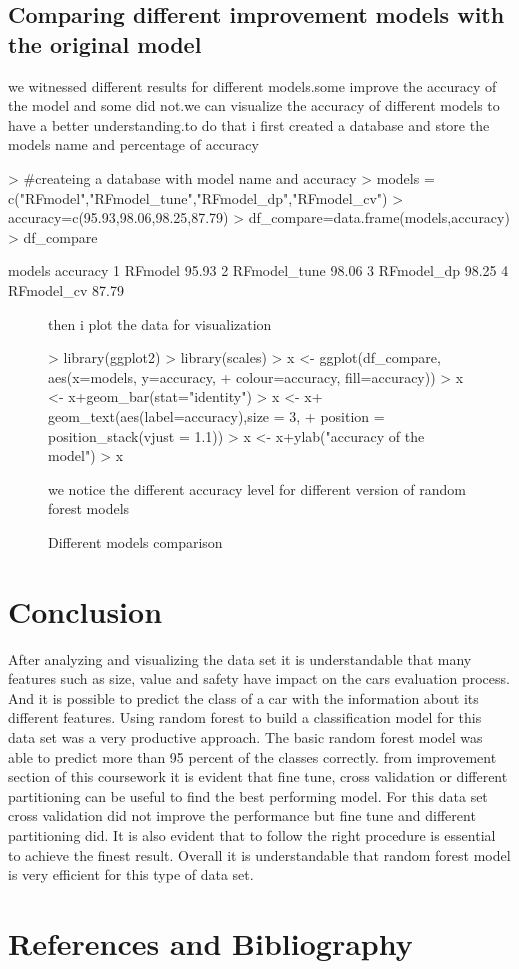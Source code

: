 \documentclass{article}
\begin{document}
\subsection{Comparing different improvement models with the original model}
we witnessed different results for different models.some improve the accuracy of the model and some did not.we can visualize the accuracy of different models to have a better understanding.to do that i first created a database and store the models name and percentage of accuracy
\begin{Schunk}
\begin{Sinput}
> #createing a database with model name and accuracy
> models = c("RFmodel","RFmodel_tune","RFmodel_dp","RFmodel_cv")
> accuracy=c(95.93,98.06,98.25,87.79)
> df_compare=data.frame(models,accuracy)
> df_compare
\end{Sinput}
\begin{Soutput}
        models accuracy
1      RFmodel    95.93
2 RFmodel_tune    98.06
3   RFmodel_dp    98.25
4   RFmodel_cv    87.79
\end{Soutput}
\end{Schunk}
\begin{figure}
then i plot the data for visualization
\begin{Schunk}
\begin{Sinput}
> library(ggplot2)
> library(scales)
> x <-  ggplot(df_compare, aes(x=models, y=accuracy, 
+                              colour=accuracy, fill=accuracy))
> x <-  x+geom_bar(stat="identity")
> x <-  x+ geom_text(aes(label=accuracy),size = 3,
+           position = position_stack(vjust = 1.1))
> x <-  x+ylab("accuracy of the model")
> x
\end{Sinput}
\end{Schunk}
\caption{Different models comparison}
we notice the different accuracy level for different version of random forest  models
\end{figure}
\newpage
\section{Conclusion}
After analyzing and visualizing the data set it is understandable that many features such as size, value and safety have impact on the cars evaluation process. And it is possible to predict the class of a car with the information about its different features. Using random forest to build a classification model for this data set was a very productive approach. The basic random forest model was able to predict more than 95 percent of the classes correctly.
\break
\break
from improvement section of this coursework it is evident that fine tune, cross validation or different partitioning can be useful to find the best performing model. For this data set cross validation did not improve the performance but fine tune and different partitioning did. It is also evident that to follow the right procedure is essential to achieve the finest result. Overall it is understandable that random forest model is very efficient for this type of data set.


\newpage
\section{References and Bibliography}
\printbibliography[heading=none]
\end{document}
